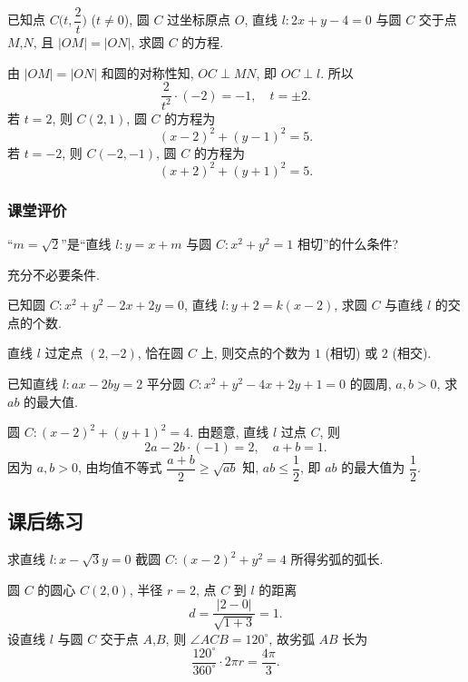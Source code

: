\begin{example}
    已知点 $C\Big(t,\dfrac2t\Big)$ ($t\neq0$), 圆 $C$ 过坐标原点 $O$, 直线 $l\colon 2x+y-4=0$ 与圆 $C$ 交于点 $M$,$N$, 且 $|OM|=|ON|$, 求圆 $C$ 的方程.
\end{example}
\beginsolution
    由 $|OM|= |ON|$ 和圆的对称性知, $OC\perp MN$, 即 $OC\perp l$. 所以
    \[\frac{2}{t^2}\cdot (-2)= -1,\quad t=\pm2.\]
    若 $t= 2$, 则 $C(2,1)$, 圆 $C$ 的方程为
    \[(x-2)^2+ (y-1)^2= 5.\]
    若 $t= -2$, 则 $C(-2,-1)$, 圆 $C$ 的方程为
    \[(x+2)^2+ (y+1)^2= 5.\]
\endsolution

\subsubsection{课堂评价}
\begin{exercise}
    “$m=\sqrt2$”是“直线 $l\colon y=x+m$ 与圆 $C\colon x^2 +y^2 =1$ 相切”的什么条件?
\end{exercise}
\beginsolution
    充分不必要条件.
\endsolution

\begin{exercise}
    已知圆 $C\colon x^2 +y^2 -2x+2y=0$, 直线 $l\colon y+2=k(x-2)$, 求圆 $C$ 与直线 $l$ 的交点的个数.
\end{exercise}
\beginsolution
    直线 $l$ 过定点 $(2,-2)$,
    恰在圆 $C$ 上, 则交点的个数为 $1$ (相切) 或 $2$ (相交).
\endsolution

\begin{exercise}
    已知直线 $l\colon ax-2by=2$ 平分圆 $C\colon x^2 +y^2 -4x+2y+1=0$ 的圆周, $a,b>0$, 求 $ab$ 的最大值.
\end{exercise}
\beginsolution
    圆 $C\colon (x-2)^2+(y+1)^2= 4$. 由题意, 直线 $l$ 过点 $C$, 则
    \[2a- 2b\cdot (-1)= 2,\quad a+b= 1.\]
    因为 $a,b>0$, 由均值不等式 $\dfrac{a+b}2\geqslant \sqrt{ab}$ 知, $ab\leqslant \dfrac12$, 即 $ab$ 的最大值为 $\dfrac12$.
\endsolution

\subsection{课后练习}

\begin{exercise}
    求直线 $l\colon x-\sqrt3 y=0$ 截圆 $C\colon (x-2)^2 +y^2=4$ 所得劣弧的弧长.
\end{exercise}
\beginsolution
    圆 $C$ 的圆心 $C(2,0)$, 半径 $r=2$, 点 $C$ 到 $l$ 的距离
    \[d= \frac{|2-0|}{\sqrt{1+3}}= 1.\]
    设直线 $l$ 与圆 $C$ 交于点 $A$,$B$, 则 $\angle ACB= 120^\circ$, 故劣弧 $AB$ 长为
    \[\frac{120^\circ}{360^\circ}\cdot 2\pi r
    = \frac{4\pi}{3}.\]
\endsolution

